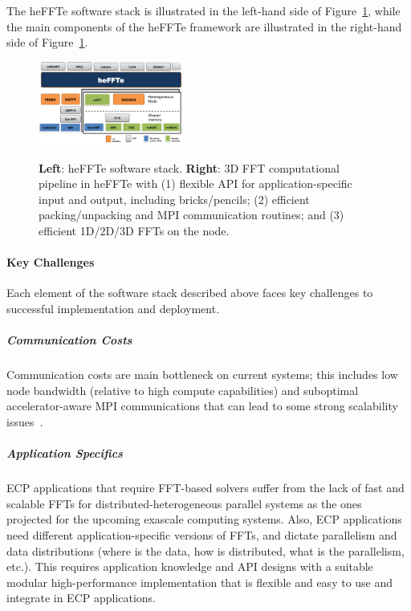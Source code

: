The heFFTe software stack is illustrated in the left-hand side of Figure~\ref{fig:fft-ecp-pipeline}, 
while the main components of the heFFTe framework are illustrated in the right-hand side of
Figure~\ref{fig:fft-ecp-pipeline}. 
 
\begin{figure}[htb]
    \centering
    \includegraphics[width=0.42\textwidth]{projects/2.3.3-MathLibs/2.3.3.13-CLOVER/heffte}~~
    \caption{\label{fig:fft-ecp-pipeline}
    {\bf Left}: heFFTe software stack. {\bf Right}: 3D FFT computational pipeline in heFFTe with
      (1) flexible API for application-specific input and output,
         including bricks/pencils;
      (2) efficient packing/unpacking and MPI communication
         routines; and
      (3) efficient 1D/2D/3D FFTs on the node.}
\end{figure}

\paragraph{Key  Challenges}
Each element of the software stack described above faces key challenges to successful implementation and deployment.
\subparagraph{Communication Costs}
Communication costs are main bottleneck 
on current systems; this includes low node bandwidth (relative to 
high compute capabilities) and suboptimal accelerator-aware MPI 
communications that can lead to some strong scalability issues~\cite{heffte-pact21}.


\subparagraph{Application Specifics}
ECP applications that require FFT-based solvers suffer from the lack of fast 
and scalable FFTs for distributed-heterogeneous parallel systems 
as the ones projected for the upcoming exascale computing systems. Also, ECP 
applications need different application-specific versions of FFTs,
and dictate parallelism and data distributions (where is the data, how is 
distributed, what is the parallelism, etc.). This requires application
knowledge and API designs with a suitable modular high-performance 
implementation that is flexible and easy to use and integrate in ECP applications.

